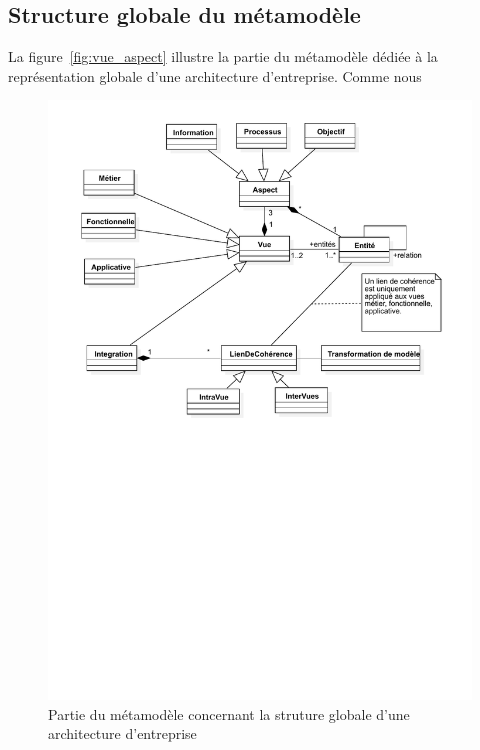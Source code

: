     \subsection{Structure globale du métamodèle}

    La figure~\ref{fig:vue_aspect} illustre la partie du métamodèle dédiée à la représentation globale d'une architecture
    d'entreprise. Comme nous  

\begin{figure}[!ht]
    \begin{center}
    \includegraphics[trim= 0cm 14cm 0cm 0cm, width=1\textwidth]{figures/4_demarche/ea3m.pdf}
    \end{center}
    \caption{Partie du métamodèle concernant la struture globale d'une architecture d'entreprise} \label{fig:ea3m}
\end{figure}





